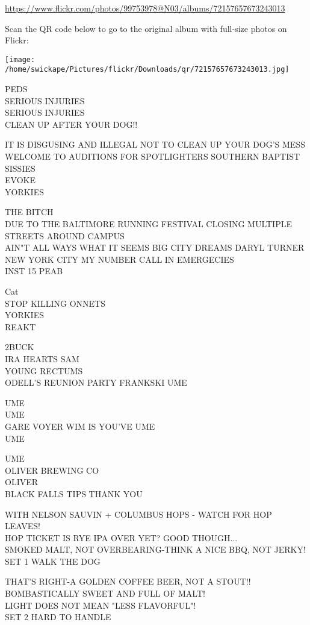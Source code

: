 \documentclass[10pt,letterpaper]{article}
\begin{document}
\url{https://www.flickr.com/photos/99753978@N03/albums/72157657673243013}

Scan the QR code below to go to the original album with full-size photos on Flickr:

\texttt{[image: /home/swickape/Pictures/flickr/Downloads/qr/72157657673243013.jpg]}


PEDS\\
SERIOUS INJURIES\\
SERIOUS INJURIES\\
CLEAN UP AFTER YOUR DOG!!

IT IS DISGUSING AND ILLEGAL NOT TO CLEAN UP YOUR DOG'S MESS\\
WELCOME TO AUDITIONS FOR SPOTLIGHTERS SOUTHERN BAPTIST SISSIES\\
EVOKE\\
YORKIES

THE BITCH\\
DUE TO THE BALTIMORE RUNNING FESTIVAL CLOSING MULTIPLE STREETS AROUND CAMPUS\\
AIN"T ALL WAYS WHAT IT SEEMS BIG CITY DREAMS DARYL TURNER NEW YORK CITY MY NUMBER CALL IN EMERGECIES\\
INST 15 PEAB

Cat\\
STOP KILLING ONNETS\\
YORKIES\\
REAKT

2BUCK\\
IRA HEARTS SAM\\
YOUNG RECTUMS\\
ODELL'S REUNION PARTY FRANKSKI UME

UME\\
UME\\
GARE VOYER WIM IS YOU'VE UME\\
UME

UME\\
OLIVER BREWING CO\\
OLIVER\\
BLACK FALLS TIPS THANK YOU

WITH NELSON SAUVIN + COLUMBUS HOPS {-} WATCH FOR HOP LEAVES!\\
HOP TICKET IS RYE IPA OVER YET?  GOOD THOUGH...\\
SMOKED MALT, NOT OVERBEARING{-}THINK A NICE BBQ, NOT JERKY!\\
SET 1 WALK THE DOG

THAT'S RIGHT{-}A GOLDEN COFFEE BEER, NOT A STOUT!!\\
BOMBASTICALLY SWEET AND FULL OF MALT!\\
LIGHT DOES NOT MEAN "LESS FLAVORFUL"!\\
SET 2 HARD TO HANDLE
\end{document}
